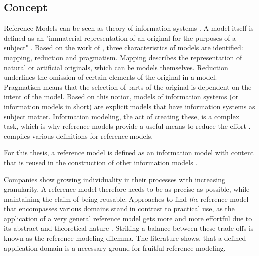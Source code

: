 		\subsection{Concept}
		Reference Models can be seen as theory of information systems \cite{Schutte1998}. A model itself is defined as an "immaterial representation of an original for the purposes of a subject" \citep[]{Becker2012Gom}. Based on the work of \cite{Stachowiak1973}, three characteristics of models are identified: mapping, reduction and pragmatism.  Mapping describes the representation of natural or artificial originals, which can be models themselves. Reduction underlines the omission of certain elements of the original in a model. Pragmatism means that the selection of parts of the original is dependent on the intent of the model. Based on this notion, models of information systems (or information models in short) are explicit models that have information systems as subject matter. Information modeling, the act of creating these, is a complex task, which is why reference models provide a useful means to reduce the effort \cite{Becker2007}. \cite{thomas2006refmod} compiles various definitions for reference models. 
		
		For this thesis, a reference model is defined as an information model with content that is reused in the construction of other information models \cite{Becker2004}.
		
		Companies show growing individuality in their processes with increasing granularity. A reference model therefore needs to be as precise as possible, while maintaining the claim of being reusable. Approaches to find \textit{the} reference model that encompasses various domains stand in contrast to practical use, as the application of a very general reference model gets more and more effortful due to its abstract and theoretical nature \citep[]{Schutte1998}. Striking a balance between these trade-offs is known as the reference modeling dilemma. The literature shows, that a defined application domain is a necessary ground for fruitful reference modeling.
		
		  

